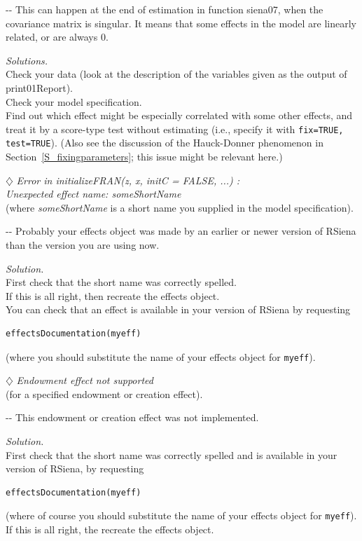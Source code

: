 \documentclass[a4paper,fleqn,11pt]{article}
\makeatletter
\newcommand{\+}{\, + \,}
\newcommand{\sfn}[1]{\textsf{#1}}
\newcommand{\rs}{{\sf RSiena}}
\newenvironment{indentation}[2]
{\par \setlength{\leftmargin}{#1}       \setlength{\rightmargin}{#2}
  \advance\linewidth -\leftmargin       \advance\linewidth -\rightmargin
  \advance\@totalleftmargin\leftmargin  \@setpar{{\@@par}}%
  \parshape 1 \@totalleftmargin         \linewidth \ignorespaces}{\par}
\makeatother
\begin{document}
\begin{indentation}{0.04\textwidth}{0pt}
\noindent
This can happen at the end of estimation in function \sfn{siena07},
when the covariance matrix is singular.
It means that some effects in the model are linearly related,
or are always 0.
\smallskip

\noindent
\emph{Solutions.}\\
Check your data (look at the description of the variables
given as the output of \sfn{print01Report}).\\
Check your model specification.\\
Find out which effect might be especially correlated
with some other effects, and treat it by a score-type
test without estimating (i.e., specify it with
\texttt{fix=TRUE, test=TRUE}).
(Also see the discussion of the Hauck-Donner phenomenon
in Section~\ref{S_fixingparameters}; this issue might
be relevant here.)
\end{indentation}
\bigskip

\noindent $\diamondsuit$ \emph{Error in initializeFRAN(z, x, initC = FALSE, ...) :\\
  Unexpected effect name: someShortName}\\
(where \emph{someShortName} is a short name you supplied in the
model specification).
\smallskip

\begin{indentation}{0.04\textwidth}{0pt}
\noindent
Probably your effects object was made by an earlier or newer version
of {\rs} than the version you are using now.
\smallskip

\noindent
\emph{Solution.} \\
First check that the short name was correctly spelled.\\
If this is all right, then recreate the effects object.\\
You can check that an effect is available in your version of
{\rs} by requesting
\begin{verbatim}
effectsDocumentation(myeff)
\end{verbatim}
(where you should substitute the name of your effects object
for \texttt{myeff}).
\end{indentation}
\bigskip


\noindent $\diamondsuit$ \emph{Endowment effect not supported}\\
(for a specified endowment or creation effect).
\smallskip

\begin{indentation}{0.04\textwidth}{0pt}
\noindent
This endowment or creation effect was not implemented.
\smallskip

\noindent
\emph{Solution.} \\
First check that the short name was correctly spelled and
is available in your version of {\rs}, by requesting
\begin{verbatim}
effectsDocumentation(myeff)
\end{verbatim}
(where of course you should substitute the name of your effects object
for \texttt{myeff}).
If this is all right, the recreate the effects object.
\end{indentation}
\bigskip
\end{document}
